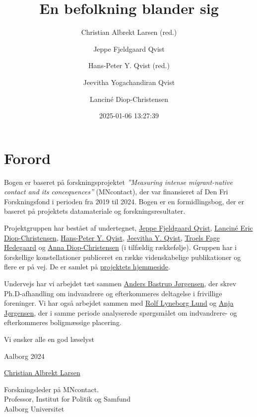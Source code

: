 \documentclass[
]{book}
\title{En befolkning blander sig}
\author{Christian Albrekt Larsen (red.) \and Jeppe Fjeldgaard Qvist \and Hans-Peter Y. Qvist (red.) \and Jeevitha Yogachandiran Qvist \and Lanciné Diop-Christensen}
\date{2025-01-06 13:27:39}
\begin{document}
\maketitle


\chapter*{Forord}\label{forord}

Bogen er baseret på forskningsprojektet \emph{''Measuring intense migrant-native contact and its concequences''} (MNcontact), der var finansieret af Den Fri Forskningsfond i perioden fra 2019 til 2024. Bogen er en formidlingsbog, der er baseret på projektets datamateriale og forskningsresultater.

Projektgruppen har bestået af undertegnet, \href{https://vbn.aau.dk/da/persons/jeppefl}{Jeppe Fjeldgaard Qvist}, \href{https://vbn.aau.dk/en/persons/led}{Lanciné Eric Diop-Christensen}, \href{https://vbn.aau.dk/da/persons/hpq}{Hans-Peter Y. Qvist}, \href{https://vbn.aau.dk/en/persons/jy}{Jeevitha Y. Qvist}, \href{https://vbn.aau.dk/en/persons/troelsfh}{Troels Fage Hedegaard} og \href{https://dk.linkedin.com/in/anna-diop-christensen-58b5ba282}{Anna Diop-Christensen} (i tilfældig rækkefølje). Gruppen har i forskellige konstellationer publiceret en række videnskabelige publikationer og flere er på vej. De er samlet på \href{https://vbn.aau.dk/en/projects/measuring-intense-migrant-native-contact-and-its-consequences/publications/}{projektets hjemmeside}.

Undervejs har vi arbejdet tæt sammen \href{https://vbn.aau.dk/en/persons/anbajo}{Anders Bastrup Jørgensen}, der skrev Ph.D-afhandling om indvandrere og efterkommeres deltagelse i frivillige foreninger. Vi har også arbejdet sammen med \href{https://vbn.aau.dk/en/persons/rolfll}{Rolf Lyneborg Lund} og \href{https://vbn.aau.dk/en/persons/anjaj}{Anja Jørgensen}, der i samme periode analyserede spørgsmålet om indvandrere- og efterkommeres boligmæssige placering.

Vi ønsker alle en god læselyst

Aalborg 2024

\href{https://vbn.aau.dk/en/persons/albrekt}{Christian Albrekt Larsen}

Forskningsleder på MNcontact.\\
Professor, Institut for Politik og Samfund\\
Aalborg Universitet\\
\end{document}
